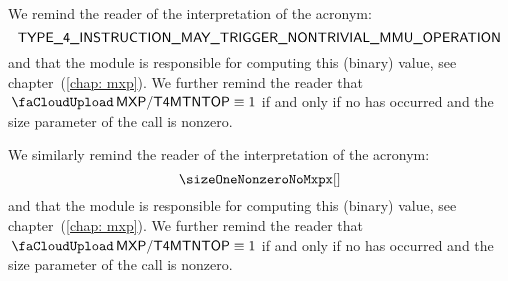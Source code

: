 \saNote{}
We remind the reader of the interpretation of the \miscMxpTypeFourInstMayTriggerMmu{} acronym:
\[
	\textsf{TYPE\_4\_INSTRUCTION\_MAY\_TRIGGER\_NONTRIVIAL\_MMU\_OPERATION}
\]
and that the \mxpMod{} module is responsible for computing this (binary) value, see chapter~(\ref{chap: mxp}).
We further remind the reader that $\miscMxpTypeFourInstMayTriggerMmu \equiv 1$ if and only if no \mxpxSH{} has occurred and the size parameter of the \mxpMod{} call is nonzero.

\saNote{}
We similarly remind the reader of the interpretation of the \miscMxpSizeOneNonzeroNoMxpx{} acronym:
\[
	\sizeOneNonzeroNoMxpx[]
\]
and that the \mxpMod{} module is responsible for computing this (binary) value, see chapter~(\ref{chap: mxp}).
We further remind the reader that $\miscMxpTypeFourInstMayTriggerMmu \equiv 1$ if and only if no \mxpxSH{} has occurred and the size parameter of the \mxpMod{} call is nonzero.
